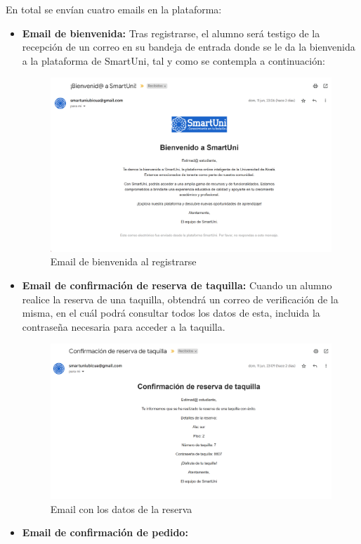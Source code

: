 \documentclass[12pt]{report}
\begin{document}
En total se envían cuatro emails en la plataforma:
\begin{itemize}
    \item \textbf{Email de bienvenida:}
    Tras registrarse, el alumno será testigo de la recepción de un correo en su bandeja de entrada donde se le da la bienvenida a la plataforma de SmartUni, tal y como se contempla a continuación:
    \begin{figure}[H]
        \centering
        \includegraphics[width=0.8\linewidth]{imagenes//emails/email_bienvenida.png}
        \caption{Email de bienvenida al registrarse}
        \label{fig:enter-label}
    \end{figure}
    \item \textbf{Email de confirmación de reserva de taquilla:}
    Cuando un alumno realice la reserva de una taquilla, obtendrá un correo de verificación de la misma, en el cuál podrá consultar todos los datos de esta, incluida la contraseña necesaria para acceder a la taquilla.
    \begin{figure}[H]
        \centering
        \includegraphics[width=0.8\linewidth]{imagenes//emails/email_confirm_taquilla.png}
        \caption{Email con los datos de la reserva}
        \label{fig:enter-label}
    \end{figure}
    \item \textbf{Email de confirmación de pedido:}

\end{itemize}
\end{document}
